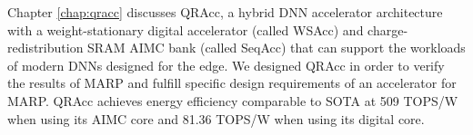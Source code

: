 Chapter \ref{chap:qracc} discusses QRAcc, a hybrid DNN accelerator architecture with a weight-stationary digital accelerator (called WSAcc) and charge-redistribution SRAM AIMC bank (called SeqAcc) that can support the workloads of modern DNNs designed for the edge. We designed QRAcc in order to verify the results of MARP and fulfill specific design requirements of an accelerator for MARP. QRAcc achieves energy efficiency comparable to SOTA at 509 TOPS/W when using its AIMC core and 81.36 TOPS/W when using its digital core.